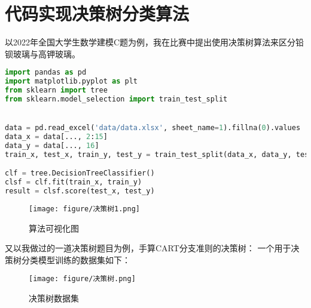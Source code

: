 \documentclass[twoside]{article}
\begin{document}
\section*{代码实现决策树分类算法}
以2022年全国大学生数学建模C题为例，我在比赛中提出使用决策树算法来区分铅钡玻璃与高钾玻璃。
\begin{lstlisting}[language={python}]
import pandas as pd
import matplotlib.pyplot as plt
from sklearn import tree
from sklearn.model_selection import train_test_split


data = pd.read_excel('data/data.xlsx', sheet_name=1).fillna(0).values
data_x = data[..., 2:15]
data_y = data[..., 16]
train_x, test_x, train_y, test_y = train_test_split(data_x, data_y, test_size=0.3)

clf = tree.DecisionTreeClassifier()
clsf = clf.fit(train_x, train_y)
result = clsf.score(test_x, test_y)
\end{lstlisting}
\begin{figure}[h]
    \centering
    \texttt{[image: figure/决策树1.png]}
    \caption{算法可视化图}
\end{figure}
又以我做过的一道决策树题目为例，手算CART分支准则的决策树：
一个用于决策树分类模型训练的数据集如下：
\begin{figure}[h]
    \centering
    \texttt{[image: figure/决策树.png]}
    \caption{决策树数据集}
\end{figure}
\end{document}
